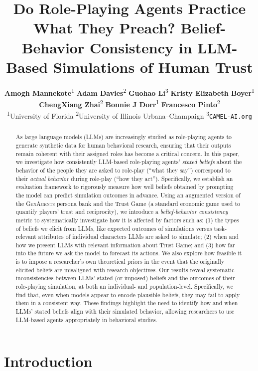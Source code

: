 \documentclass{article} %
\title{Do Role-Playing Agents Practice What They Preach? Belief-Behavior Consistency in LLM-Based Simulations of Human Trust}
\author{%
  \textbf{Amogh Mannekote}\textsuperscript{1}\quad
  \textbf{Adam Davies}\textsuperscript{2}\quad
  \textbf{Guohao Li}\textsuperscript{3}\quad
  \textbf{Kristy Elizabeth Boyer}\textsuperscript{1}\\%
  \textbf{ChengXiang Zhai}\textsuperscript{2}\quad
  \textbf{Bonnie J Dorr}\textsuperscript{1}\quad
  \textbf{Francesco Pinto}\textsuperscript{2}\\[1ex]%
  \textsuperscript{1}University of Florida\quad
  \textsuperscript{2}University of Illinois Urbana–Champaign\quad
  \textsuperscript{3}\texttt{CAMEL-AI.org}%
}
\begin{document}
\doparttoc %
\faketableofcontents %

\ifcolmsubmission
\linenumbers
\fi

\maketitle

\begin{abstract}
As large language models (LLMs) are increasingly studied as role-playing agents to generate synthetic data for human behavioral research, ensuring that their outputs remain coherent with their assigned roles has become a critical concern. In this paper, we investigate how consistently LLM-based role-playing agents' \textit{stated beliefs} about the behavior of the people they are asked to role-play (``what they say'') correspond to their \textit{actual behavior} during role-play (``how they act''). Specifically, we establish an evaluation framework to rigorously measure how well beliefs obtained by prompting the model can predict simulation outcomes in advance. Using an augmented version of the \textsc{GenAgents} persona bank and the Trust Game (a standard economic game used to quantify players' trust and reciprocity), we introduce a \emph{belief-behavior consistency} metric to systematically investigate how it is affected by factors such as: (1) the types of beliefs we elicit from LLMs, like expected outcomes of simulations versus task-relevant attributes of individual characters LLMs are asked to simulate; (2) when and how we present LLMs with relevant information about Trust Game; and (3) how far into the future we ask the model to forecast its actions. 
We also explore how feasible it is to impose a researcher's own theoretical priors in the event that the originally elicited beliefs are misaligned with research objectives. Our results reveal systematic inconsistencies between LLMs' stated (or imposed) beliefs and the outcomes of their role-playing simulation, at both an individual- and population-level. Specifically, we find that, even when models appear to encode plausible beliefs, they may fail to apply them in a consistent way. These findings highlight the need to identify how and when LLMs’ stated beliefs align with their simulated behavior, allowing researchers to use LLM-based agents appropriately in behavioral studies.
\end{abstract}


\section{Introduction}
\label{sec:introduction}
\end{document}
